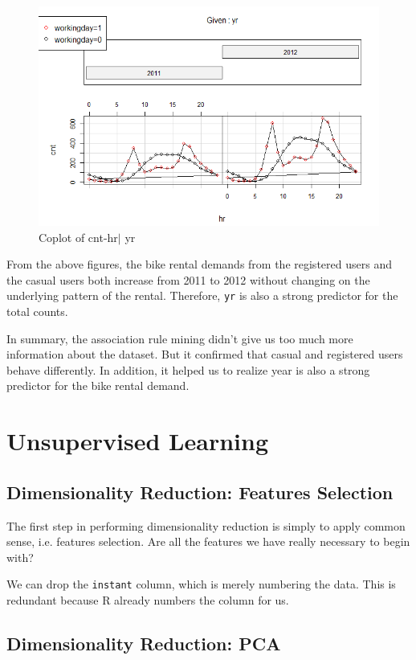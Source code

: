 \documentclass[12pt]{article}
\begin{document}
		\begin{figure}[H]
			\centering
			\includegraphics[width=\linewidth]{figures/cnt_year.png}
			\caption{Coplot of cnt-hr$|$ yr}
		\end{figure}
    From the above figures, the bike rental demands from the registered users and the casual users both increase from 2011 to 2012 without changing on the underlying pattern of the rental. Therefore, \texttt{yr} is also a strong predictor for the total counts.
    
    In summary, the association rule mining didn't give us too much more information about the dataset. But it confirmed that casual and registered users behave differently. In addition, it helped us to realize year is also a strong predictor for the bike rental demand. 
       
	\section{Unsupervised Learning}
	\subsection{Dimensionality Reduction: Features Selection}
	The first step in performing dimensionality reduction is simply to apply common sense, i.e. features selection. Are all the features we have really necessary to begin with?
	
	We can drop the \texttt{instant} column, which is merely numbering the data. This is redundant because R already numbers the column for us. 
	
	\subsection{Dimensionality Reduction: PCA }
	\label{sec:dimension-reduction}
	
\end{document}
